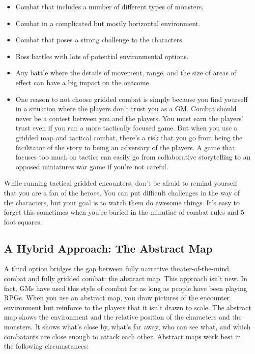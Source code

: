 \documentclass[10pt,a4paper,twoside,bg=print,twocolumn,openany,nodeprecatedcode]{dndbook}
\begin{document}
\begin{itemize}
\item Combat that includes a number of different types of monsters.
\item Combat in a complicated but mostly horizontal environment.
\item Combat that poses a strong challenge to the characters.
\item Boss battles with lots of potential environmental options.
\item Any battle where the details of movement, range, and the size of areas of effect can have a big impact on the outcome.
\item One reason to not choose gridded combat is simply because you find yourself in a situation where the players don't trust you as a GM. Combat should never be a contest between you and the players. You must earn the players' trust even if you run a more tactically focused game. But when you use a gridded map and tactical combat, there's a risk that you go from being the facilitator of the story to being an adversary of the players. A game that focuses too much on tactics can easily go from collaborative storytelling to an opposed miniatures war game if you're not careful.
\end{itemize}

While running tactical gridded encounters, don't be afraid to remind yourself that you are a fan of the heroes. You can put difficult challenges in the way of the characters, but your goal is to watch them do awesome things. It's easy to forget this sometimes when you're buried in the minutiae of combat rules and 5-foot squares.
\subsection{A Hybrid Approach: The Abstract Map}
A third option bridges the gap between fully narrative theater-of-the-mind combat and fully gridded combat: the abstract map. This approach isn't new. In fact, GMs have used this style of combat for as long as people have been playing RPGs.
When you use an abstract map, you draw pictures of the encounter environment but reinforce to the players that it isn't drawn to scale. The abstract map shows the environment and the relative position of the characters and the monsters. It shows what's close by, what's far away, who can see what, and which combatants are close enough to attack each other.
Abstract maps work best in the following circumstances:
\end{document}
